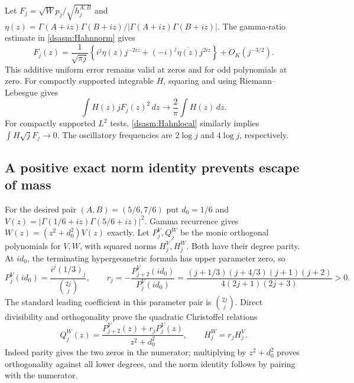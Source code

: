 \documentclass[11pt,letterpaper]{article}
\theoremstyle{remark}\newtheorem{remark}[theorem]{Remark}
\begin{document}
Let $F_j=\sqrt Wp_j/\sqrt{h_j^{A,B}}$ and
$\eta(z)=\Gamma(A+iz)\Gamma(B+iz)/|\Gamma(A+iz)\Gamma(B+iz)|$.
The gamma-ratio estimate in \eqref{dsasm:Hahnnorm} gives
\begin{equation}\label{dsasm:Hahnlocal}
 F_j(z)=\frac1{\sqrt{\pi j}}
 \left\{i^j\eta(z)j^{-2iz}+(-i)^j\overline{\eta(z)}j^{2iz}\right\}
          +O_K(j^{-3/2}).
\end{equation}
This additive uniform error remains valid at zeros and for odd
polynomials at zero. For compactly supported integrable $H$, squaring
and using Riemann--Lebesgue gives
\begin{equation}\label{dsasm:localmeasure}
 \int H(z)jF_j(z)^2\,dz\longrightarrow\frac2\pi\int H(z)\,dz.
\end{equation}
For compactly supported $L^2$ tests, \eqref{dsasm:Hahnlocal} similarly
implies $\int H\sqrt jF_j\to0$. The oscillatory frequencies are
$2\log j$ and $4\log j$, respectively.

\subsection{A positive exact norm identity prevents escape of mass}
For the desired pair $(A,B)=(5/6,7/6)$ put $d_0=1/6$ and
$V(z)=|\Gamma(1/6+iz)\Gamma(5/6+iz)|^2$. Gamma recurrence gives
$W(z)=(z^2+d_0^2)V(z)$ exactly. Let $P_j^V,Q_j^W$ be the monic
orthogonal polynomials for $V,W$, with squared norms $H_j^V,H_j^W$.
Both have their degree parity. At $id_0$, the terminating
hypergeometric formula has upper parameter zero, so
\[
 P_j^V(id_0)=\frac{i^j(1/3)_j}{\binom{2j}{j}},\qquad
 r_j=-\frac{P_{j+2}^V(id_0)}{P_j^V(id_0)}
 =\frac{(j+1/3)(j+4/3)(j+1)(j+2)}{4(2j+1)(2j+3)}>0.
\]
The standard leading coefficient in this parameter pair is
$\binom{2j}{j}$. Direct divisibility and orthogonality prove the
quadratic Christoffel relations
\begin{equation}\label{dsasm:Christoffel}
 Q_j^W(z)=\frac{P_{j+2}^V(z)+r_jP_j^V(z)}{z^2+d_0^2},\qquad
 H_j^W=r_jH_j^V.
\end{equation}
Indeed parity gives the two zeros in the numerator; multiplying by
$z^2+d_0^2$ proves orthogonality against all lower degrees, and the
norm identity follows by pairing with the numerator.
\end{document}
